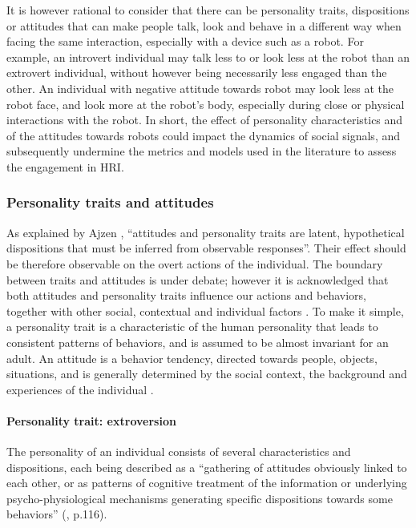 It is however rational to consider that there can be personality traits, dispositions or attitudes that can make people talk, look and behave in a different way when facing the same interaction, especially with a device such as a robot.
For example, an introvert individual may talk less to or look less at the robot than an extrovert individual, without however being necessarily less engaged than the other. 
An individual with negative attitude towards robot may look less at the robot face, and look more at the robot's body, especially during close or physical interactions with the robot.
In short, the effect of  personality characteristics and of the attitudes towards robots could impact the dynamics of social signals, and subsequently undermine the metrics and models used in the literature to assess the engagement in HRI.


\subsubsection{Personality traits and attitudes}


As explained by Ajzen \cite{Ajzen1986}, ``attitudes and personality traits are latent, hypothetical dispositions that must be inferred from observable responses''. Their effect should be therefore observable on the overt actions of the individual.
The boundary between traits and attitudes is under debate; however it is acknowledged that both attitudes and personality traits influence our actions and behaviors, together with other social, contextual and individual factors \cite{Scherer1981}.
To make it simple, a personality trait is a characteristic of the human personality that leads to consistent patterns of behaviors, and is assumed to be almost invariant for an adult.
An attitude is a behavior tendency, directed towards people, objects, situations, and is generally determined by the social context, the background and experiences of the individual \cite{Wood2000}.



\paragraph{Personality trait: extroversion}

The personality of an individual consists of several characteristics and dispositions, each  being described as a ``gathering of attitudes obviously linked to each other, or as patterns of cognitive treatment of the information or underlying psycho-physiological mechanisms generating specific dispositions towards some behaviors'' (\cite{Scherer1981}, p.116).

